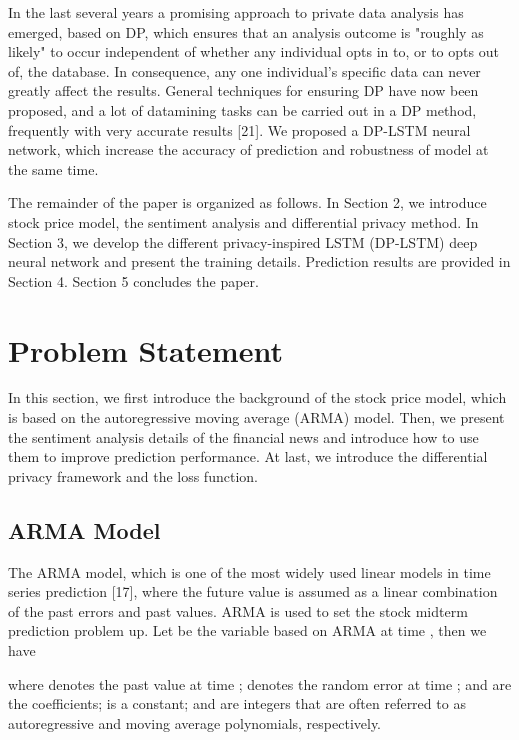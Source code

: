 \documentclass{article}
\begin{document}
In the last several years a promising approach to private data analysis has emerged, based on DP, which ensures that an analysis outcome is "roughly as likely" to occur independent of whether any individual opts in to, or to opts out of, the database. In consequence, any one individual's specific data can never greatly affect the results. General techniques for ensuring DP have now been proposed, and a lot of datamining tasks can be carried out in a DP method, frequently with very accurate results [21]. We proposed a DP-LSTM neural network, which increase the accuracy of prediction and robustness of model at the same time.

The remainder of the paper is organized as follows. In Section 2, we introduce stock price model, the sentiment analysis and differential privacy method. In Section 3, we develop the different privacy-inspired LSTM (DP-LSTM) deep neural network and present the training details. Prediction results are provided in Section 4. Section 5 concludes the paper.



\section{Problem Statement}
\label{gen_inst}


In this section, we first introduce the background of the stock price model, which is based on the autoregressive moving average (ARMA) model. Then, we present the sentiment analysis details of the financial news and introduce how to use them to improve prediction performance. At last, we introduce the differential privacy framework and the loss function.


\subsection{ARMA Model}
The ARMA model, which is one of the most widely used linear models in time series prediction [17], where the future value is assumed as a linear combination of the past errors and past values. ARMA is used to set the stock midterm prediction problem up. Let  be the variable based on ARMA at time , then we have

where  denotes the past value at time ;  denotes the random error at time ;  and  are the coefficients;  is a constant;  and  are integers that are often referred to as autoregressive and moving average polynomials, respectively.
\end{document}
